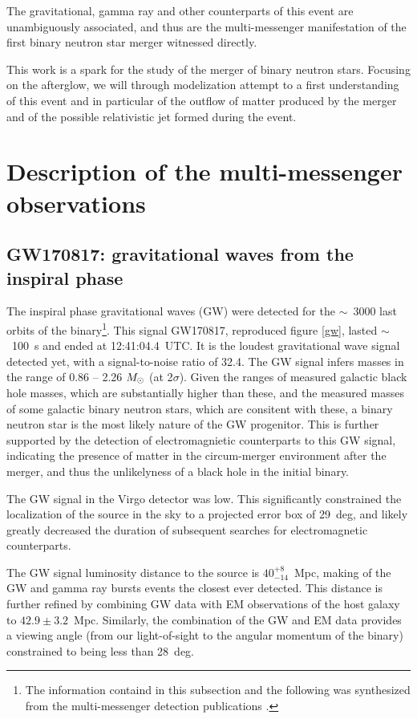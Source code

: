 The gravitational, gamma ray and other counterparts of this event are unambiguously associated, and thus are the multi-messenger manifestation of the first binary neutron star merger witnessed directly.

This work is a spark for the study of the merger of binary neutron stars. Focusing on the afterglow, we will through modelization attempt to a first understanding of this event and in particular of the outflow of matter produced by the merger and of the possible relativistic jet formed during the event.

\section{Description of the multi-messenger observations}

\subsection{GW170817: gravitational waves from the inspiral phase}

The inspiral phase gravitational waves (GW) were detected for the $\sim$~3000 last orbits of the binary\footnote{The information containd in this subsection and the following was synthesized from the multi-messenger detection publications \cite{23, 37, 51, 52}.}. This signal GW170817, reproduced figure \ref{gw}, lasted $\sim$~100~s and ended at 12:41:04.4~UTC. It is the loudest gravitational wave signal detected yet, with a signal-to-noise ratio of 32.4. The GW signal infers masses in the range of 0.86 -- 2.26 $M_{\odot}$ (at 2$\sigma$). Given the ranges of measured galactic black hole masses, which are substantially higher than these, and the measured masses of some galactic binary neutron stars, which are consitent with these, a binary neutron star is the most likely nature of the GW progenitor. This is further supported by the detection of electromagnietic counterparts to this GW signal, indicating the presence of matter in the circum-merger environment after the merger, and thus the unlikelyness of a black hole in the initial binary.

The GW signal in the Virgo detector was low. This significantly constrained the localization of the source in the sky to a projected error box of 29~deg, and likely greatly decreased the duration of subsequent searches for electromagnetic counterparts.

The GW signal luminosity distance to the source is $40_{-14}^{+8}$~Mpc, making of the GW and gamma ray bursts events the closest ever detected. This distance is further refined by combining GW data with EM observations of the host galaxy to $42.9\pm3.2$~Mpc. Similarly, the combination of the GW and EM data provides a viewing angle (from our light-of-sight to the angular momentum of the binary) constrained to being less than 28~deg.

